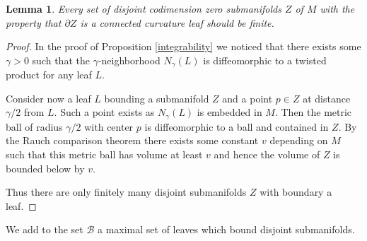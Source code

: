 \documentclass[10pt]{amsart}
\let\mathcal\mathscr
\newtheorem{lemma}[theorem]{Lemma}
\theoremstyle{definition}
\theoremstyle{remark}
\numberwithin{equation}{section}
\begin{document}
\begin{lemma}
Every set of disjoint codimension zero submanifolds $Z$ of $M$ with the property that
$\partial Z$ is a connected curvature leaf should be finite.
\end{lemma}
\begin{proof}
In the proof of Proposition \ref{integrability} we noticed that there exists some $\gamma >0$
such that the $\gamma$-neighborhood $N_{\gamma}(L)$ is diffeomorphic to a twisted product for any
leaf $L$.

Consider now a leaf $L$ bounding a submanifold $Z$ and a point $p\in Z$ at distance~$\gamma/2$ from $L$.
Such a point exists as $N_{\gamma}(L)$ is embedded in $M$.
Then the metric ball of radius $\gamma/2$ with center $p$ is diffeomorphic to a ball and contained in
$Z$. By the Rauch comparison theorem there exists some constant $v$ depending on $M$ such that
this metric ball has volume at least $v$ and hence the volume of $Z$ is bounded below by $v$.

Thus there are only finitely many disjoint submanifolds $Z$ with boundary a leaf.
\end{proof}

We add to the set $\mathcal B$ a maximal set of leaves which bound disjoint submanifolds.
\end{document}
